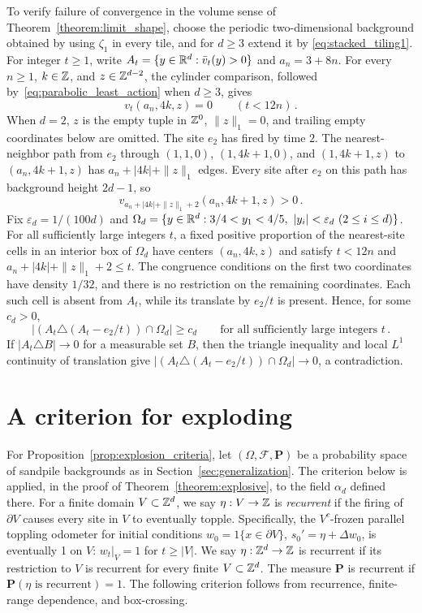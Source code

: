 \documentclass[12pt]{amsart}
\begin{document}
To verify failure of convergence in the volume sense of Theorem~\ref{theorem:limit_shape}, choose the periodic two-dimensional background obtained by using $\zeta_1$ in every tile, and for $d\geq3$ extend it by \eqref{eq:stacked_tiling1}. For integer $t\geq1$, write $A_t=\{y\in\mathbb{R}^d:\bar v_t(y)>0\}$ and $a_n=3+8n$.
For every $n\geq1$, $k\in\mathbb{Z}$, and $z\in\mathbb{Z}^{d-2}$, the cylinder comparison, followed by~\eqref{eq:parabolic_least_action} when $d\geq3$, gives
\begin{equation*}
v_t(a_n,4k,z)=0\qquad(t<12n)\,.
\end{equation*}
When $d=2$, $z$ is the empty tuple in $\mathbb{Z}^0$, $\|z\|_1=0$, and trailing empty coordinates below are omitted.
The site $e_2$ has fired by time $2$. The nearest-neighbor path from $e_2$ through $(1,1,0)$, $(1,4k+1,0)$, and $(1,4k+1,z)$ to $(a_n,4k+1,z)$ has $a_n+|4k|+\|z\|_1$ edges. Every site after $e_2$ on this path has background height $2d-1$, so
\begin{equation*}
v_{a_n+|4k|+\|z\|_1+2}(a_n,4k+1,z)>0\,.
\end{equation*}
Fix $\varepsilon_d=1/(100d)$ and $\Omega_d=\{y\in\R^d:3/4<y_1<4/5,\ |y_i|<\varepsilon_d\ (2\leq i\leq d)\}$.
For all sufficiently large integers $t$, a fixed positive proportion of the nearest-site cells in an interior box of $\Omega_d$ have centers $(a_n,4k,z)$ and satisfy $t<12n$ and $a_n+|4k|+\|z\|_1+2\leq t$. The congruence conditions on the first two coordinates have density $1/32$, and there is no restriction on the remaining coordinates. Each such cell is absent from $A_t$, while its translate by $e_2/t$ is present. Hence, for some $c_d>0$,
\begin{equation*}
\left|(A_t\triangle(A_t-e_2/t))\cap\Omega_d\right|\geq c_d
\qquad\text{for all sufficiently large integers }t\,.
\end{equation*}
If $|A_t\triangle B|\to0$ for a measurable set $B$, then the triangle inequality and local $L^1$ continuity of translation give $|(A_t\triangle(A_t-e_2/t))\cap\Omega_d|\to0$, a contradiction.

\section{A criterion for exploding} \label{sec:criteria}

For Proposition~\ref{prop:explosion_criteria}, let $(\Omega,\mathcal F,\mathbf P)$ be a probability space of sandpile backgrounds as in Section~\ref{sec:generalization}. The criterion below is applied, in the proof of Theorem~\ref{theorem:explosive}, to the field $\alpha_d$ defined there.
For a finite domain $V \subset \mathbb{Z}^d$, we say  $\eta: V \to \mathbb{Z}$ is {\it recurrent} if the firing of $\partial V$ causes every site in $V$ to eventually topple. Specifically, the $V^c$-frozen parallel toppling odometer for initial conditions $w_0 = 1\{ x \in \partial V\}$, $s_0' = \eta + \Delta w_0$, is eventually 1 on $V$: $w_t |_{V} = 1$ for $t \geq |V|$. We say $\eta: \mathbb{Z}^d \to \mathbb{Z}$ is recurrent if its restriction to $V$ is recurrent for every finite $V \subset \mathbb{Z}^d$.  The measure $\mathbf{P}$ is recurrent if $\mathbf{P}(\mbox{$\eta$ is recurrent}) = 1$. The following criterion follows from recurrence, finite-range dependence, and box-crossing.
\end{document}
